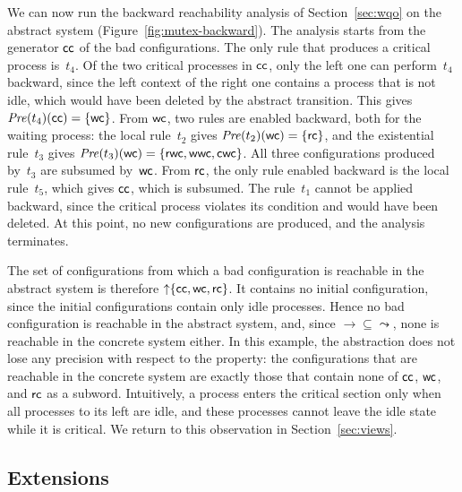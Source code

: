 We can now run the backward reachability analysis of
Section~\ref{sec:wqo} on the abstract system
(Figure~\ref{fig:mutex-backward}). The analysis starts from the generator
$\mathsf{c}\mathsf{c}$ of the bad configurations. The only rule that produces a critical
process is~$t_4$. Of the two critical processes in $\mathsf{c}\mathsf{c}$, only the left
one can perform~$t_4$ backward, since the left context of the right one
contains a process that is not idle, which would have been deleted by the
abstract transition. This gives $\mathit{Pre}(t_4)(\mathsf{c}\mathsf{c}) = \{\mathsf{w}\mathsf{c}\}$. From
$\mathsf{w}\mathsf{c}$, two rules are enabled backward, both for the waiting process:
the local rule~$t_2$ gives $\mathit{Pre}(t_2)(\mathsf{w}\mathsf{c}) = \{\mathsf{r}\mathsf{c}\}$, and the
existential rule~$t_3$ gives $\mathit{Pre}(t_3)(\mathsf{w}\mathsf{c}) =
\{\mathsf{r}\mathsf{w}\mathsf{c}, \mathsf{w}\mathsf{w}\mathsf{c}, \mathsf{c}\mathsf{w}\mathsf{c}\}$. All three
configurations produced by~$t_3$ are subsumed by~$\mathsf{w}\mathsf{c}$. From
$\mathsf{r}\mathsf{c}$, the only rule enabled backward is the local rule~$t_5$, which
gives $\mathsf{c}\mathsf{c}$, which is subsumed. The rule~$t_1$ cannot be applied
backward, since the critical process violates its condition and would have
been deleted. At this point, no new configurations are produced, and the
analysis terminates.

The set of configurations from which a bad configuration is reachable in the
abstract system is therefore ${\uparrow}\{\mathsf{c}\mathsf{c}, \mathsf{w}\mathsf{c}, \mathsf{r}\mathsf{c}\}$.
It contains no initial configuration, since the initial configurations contain
only idle processes. Hence no bad configuration is reachable in the abstract
system, and, since $\to \subseteq \leadsto$, none is reachable in the concrete
system either. In this example, the abstraction does not lose any precision
with respect to the property: the configurations that are reachable in the
concrete system are exactly those that contain none of $\mathsf{c}\mathsf{c}$,
$\mathsf{w}\mathsf{c}$, and $\mathsf{r}\mathsf{c}$ as a subword. Intuitively, a process enters the
critical section only when all processes to its left are idle, and these
processes cannot leave the idle state while it is critical. We return to this
observation in Section~\ref{sec:views}.

\subsection{Extensions}

